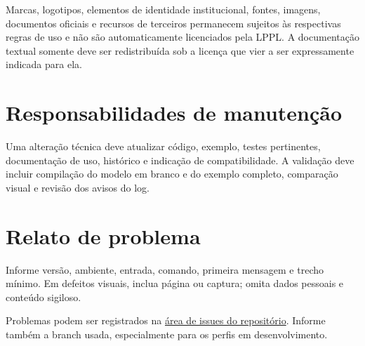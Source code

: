Marcas, logotipos, elementos de identidade institucional, fontes, imagens, documentos oficiais e recursos de terceiros permanecem sujeitos às respectivas regras de uso e não são automaticamente licenciados pela LPPL. A documentação textual somente deve ser redistribuída sob a licença que vier a ser expressamente indicada para ela.

\section{Responsabilidades de manutenção}

Uma alteração técnica deve atualizar código, exemplo, testes pertinentes, documentação de uso, histórico e indicação de compatibilidade. A validação deve incluir compilação do modelo em branco e do exemplo completo, comparação visual e revisão dos avisos do log.

\section{Relato de problema}

Informe versão, ambiente, entrada, comando, primeira mensagem e trecho mínimo. Em defeitos visuais, inclua página ou captura; omita dados pessoais e conteúdo sigiloso.

Problemas podem ser registrados na
\href{https://github.com/igormrqs/undftex/issues}{área de issues do repositório}.
Informe também a branch usada, especialmente para os perfis em desenvolvimento.
